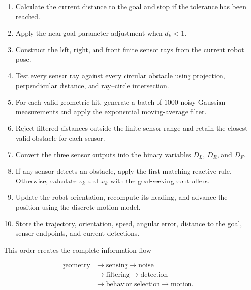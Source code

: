 \documentclass[10pt,twocolumn,a4paper]{article}
\begin{document}
\begin{enumerate}
    \item Calculate the current distance to the goal and stop if the
    tolerance has been reached.

    \item Apply the near-goal parameter adjustment when $d_k<1$.

    \item Construct the left, right, and front finite sensor rays from
    the current robot pose.

    \item Test every sensor ray against every circular obstacle using
    projection, perpendicular distance, and ray--circle intersection.

    \item For each valid geometric hit, generate a batch of $1000$ noisy
    Gaussian measurements and apply the exponential moving-average filter.

    \item Reject filtered distances outside the finite sensor range and
    retain the closest valid obstacle for each sensor.

    \item Convert the three sensor outputs into the binary variables
    $D_L$, $D_R$, and $D_F$.

    \item If any sensor detects an obstacle, apply the first matching
    reactive rule. Otherwise, calculate $v_k$ and $\omega_k$ with the
    goal-seeking controllers.

    \item Update the robot orientation, recompute its heading, and
    advance the position using the discrete motion model.

    \item Store the trajectory, orientation, speed, angular error,
    distance to the goal, sensor endpoints, and current detections.
\end{enumerate}

This order creates the complete information flow

\[
\begin{aligned}
\text{geometry}
&\rightarrow \text{sensing}
\rightarrow \text{noise}\\
&\rightarrow \text{filtering}
\rightarrow \text{detection}\\
&\rightarrow \text{behavior selection}
\rightarrow \text{motion}.
\end{aligned}
\]
\end{document}
